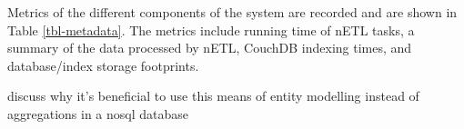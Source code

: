 Metrics of the different components of the system are recorded and are shown in Table \ref{tbl-metadata}. The metrics include running time of nETL tasks, a summary of the data processed by nETL, CouchDB indexing times, and database/index storage footprints.




discuss why it's beneficial to use this means of entity modelling instead of aggregations in a nosql database